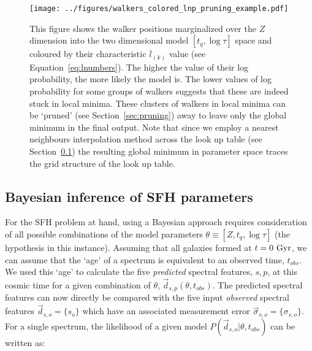 \documentclass[useAMS,usenatbib]{mn2e}
\begin{document}
\begin{figure}
\centering
\texttt{[image: ../figures/walkers\_colored\_lnp\_pruning\_example.pdf]}
\caption{This figure shows the walker positions marginalized over the $Z$ dimension into the two dimensional model $[t_q, \log\tau]$ space and coloured by their characteristic $\overline{l}_{(k)}$ value (see Equation~\ref{eq:lnumbers}). The higher the value of their log probability, the more likely the model is. The lower values of log probability for some groups of walkers suggests that these are indeed stuck in local minima. These clusters of walkers in local minima can be `pruned' (see Section~\ref{sec:pruning}) away to leave only the global minimum in the final output. Note that since we employ a nearest neighbours interpolation method across the look up table (see Section~\ref{sec:emcee}) the resulting global minimum in parameter space traces the grid structure of the look up table.}
\label{fig:localminima}
\end{figure}


\subsection{Bayesian inference of SFH parameters}\label{sec:emcee}

For the SFH problem at hand, using a Bayesian approach requires consideration of all possible combinations of the model parameters $\theta \equiv [Z, t_{q}, \log \tau]$ (the hypothesis in this instance). Assuming that all galaxies formed at $t=0~\rm{Gyr}$, we can assume that the `age' of a spectrum is equivalent to an observed time, $t_{obs}$. We used this  `age' to calculate the five \emph{predicted} spectral features, $s,p$, at this cosmic time for a given combination of $\theta$, $\vec{d}_{s,p}(\theta, t_{obs})$. The predicted spectral features can now directly be compared with the five input \emph{observed} spectral features $\vec{d}_{s, o} = \{s_o\}$ which have an associated measurement error $\vec{\sigma}_{s, o} = \{\sigma_{s, o}\}$. For a single spectrum, the likelihood of a given model $P(\vec{d}_{s, o}|\theta, t_{obs})$ can be written as:


\end{document}
